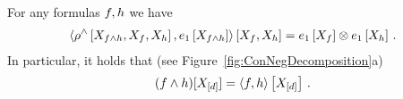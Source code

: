 \begin{theorem}\label{the:effectiveConjunction}
	For any formulas $f,h$ we have
	\begin{align*}
		\left\langle 
			\rho^{\land}\left[X_{f\land h},X_{f},X_{h}\right],e_{1}\left[X_{f\land h}\right]
		\right\rangle \left[ X_{f},X_{h} \right]
		= e_{1}\left[X_{f}\right] \otimes e_{1}\left[X_{h}\right] \, . 
	\end{align*}
	In particular, it holds that (see Figure~\ref{fig:ConNegDecomposition}a)
	\begin{align*}
		(f\land h)[X_{[d]}] = \left\langle f,h\right\rangle \left[ X_{[d]} \right] \, . 
	\end{align*}
\end{theorem}
